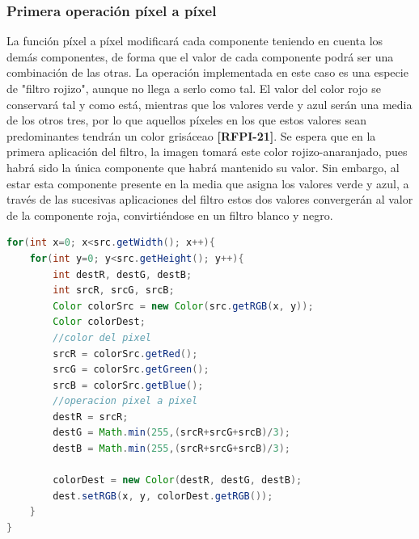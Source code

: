 \subsubsection{Primera operación píxel a píxel}
La función píxel a píxel modificará cada componente teniendo en cuenta los demás componentes, de forma que el valor de cada componente podrá ser una combinación de las otras.
\vskip0.3cm
La operación implementada en este caso es una especie de "filtro rojizo", aunque no llega a serlo como tal. El valor del color rojo se conservará tal y como está, mientras que los valores verde y azul serán una media de los otros tres, por lo que aquellos píxeles en los que estos valores sean predominantes tendrán un color grisáceao \textbf{[RFPI-21]}.
\vskip0.3cm
Se espera que en la primera aplicación del filtro, la imagen tomará este color rojizo-anaranjado, pues habrá sido la única componente que habrá mantenido su valor. Sin embargo, al estar esta componente presente en la media que asigna los valores verde y azul, a través de las sucesivas aplicaciones del filtro estos dos valores convergerán al valor de la componente roja, convirtiéndose en un filtro blanco y negro.
\begin{lstlisting}[language=Java, caption=Operación pixel a pixel, label=lst:graddesc]
for(int x=0; x<src.getWidth(); x++){
    for(int y=0; y<src.getHeight(); y++){
        int destR, destG, destB;
        int srcR, srcG, srcB;
        Color colorSrc = new Color(src.getRGB(x, y));
        Color colorDest;
        //color del pixel
        srcR = colorSrc.getRed();
        srcG = colorSrc.getGreen();
        srcB = colorSrc.getBlue();
        //operacion pixel a pixel
        destR = srcR;
        destG = Math.min(255,(srcR+srcG+srcB)/3);
        destB = Math.min(255,(srcR+srcG+srcB)/3);
                
        colorDest = new Color(destR, destG, destB);
        dest.setRGB(x, y, colorDest.getRGB());
    }
}
\end{lstlisting}
\vskip0.3cm
